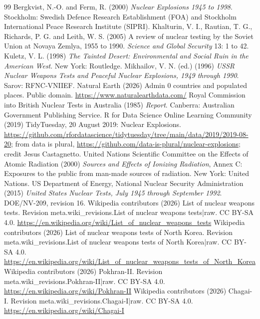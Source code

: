 \documentclass[11pt,a4paper]{article}
\begin{document}
\begin{thebibliography}{99}
 Bergkvist, N.-O. and Ferm, R. (2000) \emph{Nuclear Explosions 1945 to 1998}. Stockholm: Swedish Defence Research Establishment (FOA) and Stockholm International Peace Research Institute (SIPRI).
 Khalturin, V. I., Rautian, T. G., Richards, P. G. and Leith, W. S. (2005) A review of nuclear testing by the Soviet Union at Novaya Zemlya, 1955 to 1990. \emph{Science and Global Security} 13: 1 to 42.
 Kuletz, V. L. (1998) \emph{The Tainted Desert: Environmental and Social Ruin in the American West}. New York: Routledge.
 Mikhailov, V. N. (ed.) (1996) \emph{USSR Nuclear Weapons Tests and Peaceful Nuclear Explosions, 1949 through 1990}. Sarov: RFNC-VNIIEF.
 Natural Earth (2026) Admin 0 countries and populated places. Public domain. \url{https://www.naturalearthdata.com/}
 Royal Commission into British Nuclear Tests in Australia (1985) \emph{Report}. Canberra: Australian Government Publishing Service.
 R for Data Science Online Learning Community (2019) TidyTuesday, 20 August 2019: Nuclear Explosions. \url{https://github.com/rfordatascience/tidytuesday/tree/main/data/2019/2019-08-20}; from data is plural, \url{https://github.com/data-is-plural/nuclear-explosions}; credit Jesus Castagnetto.
 United Nations Scientific Committee on the Effects of Atomic Radiation (2000) \emph{Sources and Effects of Ionizing Radiation}, Annex C: Exposures to the public from man-made sources of radiation. New York: United Nations.
 US Department of Energy, National Nuclear Security Administration (2015) \emph{United States Nuclear Tests, July 1945 through September 1992}. DOE/NV-209, revision 16.
 Wikipedia contributors (2026) List of nuclear weapons tests. Revision {{meta.wiki_revisions.List of nuclear weapons tests|raw}}. CC BY-SA 4.0. \url{https://en.wikipedia.org/wiki/List_of_nuclear_weapons_tests}
 Wikipedia contributors (2026) List of nuclear weapons tests of North Korea. Revision {{meta.wiki_revisions.List of nuclear weapons tests of North Korea|raw}}. CC BY-SA 4.0. \url{https://en.wikipedia.org/wiki/List_of_nuclear_weapons_tests_of_North_Korea}
 Wikipedia contributors (2026) Pokhran-II. Revision {{meta.wiki_revisions.Pokhran-II|raw}}. CC BY-SA 4.0. \url{https://en.wikipedia.org/wiki/Pokhran-II}
 Wikipedia contributors (2026) Chagai-I. Revision {{meta.wiki_revisions.Chagai-I|raw}}. CC BY-SA 4.0. \url{https://en.wikipedia.org/wiki/Chagai-I}
\end{thebibliography}
\end{document}
